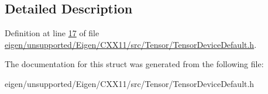 \subsection{Detailed Description}


Definition at line \hyperlink{eigen_2unsupported_2_eigen_2_c_x_x11_2src_2_tensor_2_tensor_device_default_8h_source_l00017}{17} of file \hyperlink{eigen_2unsupported_2_eigen_2_c_x_x11_2src_2_tensor_2_tensor_device_default_8h_source}{eigen/unsupported/\+Eigen/\+C\+X\+X11/src/\+Tensor/\+Tensor\+Device\+Default.\+h}.



The documentation for this struct was generated from the following file\+:\begin{DoxyCompactItemize}
\item 
eigen/unsupported/\+Eigen/\+C\+X\+X11/src/\+Tensor/\+Tensor\+Device\+Default.\+h\end{DoxyCompactItemize}
